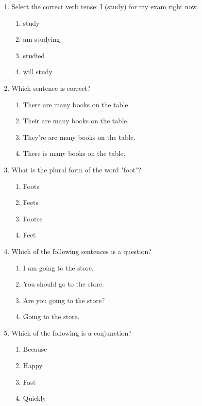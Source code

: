 \documentclass[12pt]{article}
\begin{document}
\begin{enumerate}
    \item Select the correct verb tense: I \underline{\hspace{2cm}} (study) for my exam right now.
    \begin{enumerate}[label=\Alph*.]
        \item study
        \item am studying
        \item studied
        \item will study
    \end{enumerate}
    \vspace{0.5cm}

    \item Which sentence is correct?
    \begin{enumerate}[label=\Alph*.]
        \item There are many books on the table.
        \item Their are many books on the table.
        \item They’re are many books on the table.
        \item There is many books on the table.
    \end{enumerate}
    \vspace{0.5cm}

    \item What is the plural form of the word "foot"?
    \begin{enumerate}[label=\Alph*.]
        \item Foots
        \item Feets
        \item Footes
        \item Feet
    \end{enumerate}
    \vspace{0.5cm}

    \item Which of the following sentences is a question?
    \begin{enumerate}[label=\Alph*.]
        \item I am going to the store.
        \item You should go to the store.
        \item Are you going to the store?
        \item Going to the store.
    \end{enumerate}
    \vspace{0.5cm}

    \item Which of the following is a conjunction?
    \begin{enumerate}[label=\Alph*.]
        \item Because
        \item Happy
        \item Fast
        \item Quickly
    \end{enumerate}
    \vspace{0.5cm}


\end{enumerate}
\end{document}
